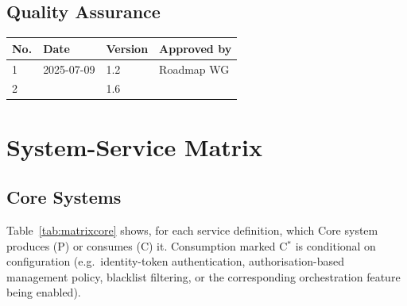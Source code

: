 \documentclass[a4paper]{arrowhead}
\begin{document}
\subsection{Quality Assurance}

\noindent\begin{tabularx}{\textwidth}{| p{0.8cm} | p{2.0cm} | p{1.2cm} | X |} \hline
\rowcolor{gray!33} No. & Date & Version & Approved by \\ \hline
1 & 2025-07-09 & 1.2 & Roadmap WG \\ \hline
2 & & 1.6 & \\ \hline
\end{tabularx}

\newpage
\appendix
\section{System-Service Matrix}
\label{app:matrix}

\subsection{Core Systems}
Table~\ref{tab:matrixcore} shows, for each service definition, which Core system produces (P) or
consumes (C) it. Consumption marked C$^*$ is conditional on configuration (e.g.\ identity-token
authentication, authorisation-based management policy, blacklist filtering, or the
corresponding orchestration feature being enabled).
\end{document}
